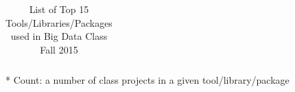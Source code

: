 \documentclass[9pt,twocolumn,twoside]{styles/osajnl}
\begin{document}
\begin{table}[htb]
\begin{center}
\begin{small}
{\begin{tabular}{l|l|l|l|l}
        \end{tabular}}
        \caption{List of Top 15 Tools/Libraries/Packages used in Big
          Data Class Fall 2015}
        \label{tab:tools-fa15}
        \begin{tablenotes}
        \item[*] Count: a number of class projects in a given tool/library/package
        \end{tablenotes}
    \end{small}
  \end{center}
\end{table}

\begin{table}[htb]
  \begin{center}
    \begin{small}
  \begin{threeparttable}
\end{threeparttable}
\end{small}
\end{center}
\end{table}
\end{document}
